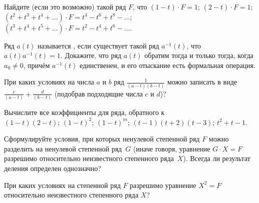 \documentclass[a4paper,12pt]{article}
\begin{document}
Найдите (если это возможно) такой ряд $F$, что
$(1-t)\cdot F=1$;
$(2-t)\cdot F=1$;
$(t^2+t^3+t^4+\dots)\cdot F=t^4-t^6+t^8-\dots$;
$(t^3+t^4+t^5+\dots)\cdot F=t^2-t^4+t^6-\dots$.








Ряд $a(t)$ называется , если существует такой ряд
$a^{-1}(t)$, что $a(t)a^{-1}(t)=1$. Докажите, что ряд
$a(t)$ обратим тогда и только тогда, когда $a_0\ne 0$,
причём $a^{-1}(t)$ единственен, и его отыскание есть
формальная операция.








При каких условиях на числа $a$ и $b$ ряд
$\displaystyle\frac1{(a-t)(b-t)}$ можно записать в виде
$\displaystyle\frac{c}{(a-t)}+\frac{d}{(b-t)}$
(подобрав подходящие числа $c$ и $d$)?








Вычислите все коэффициенты для ряда, обратного к
\\
 $(1-t)(2-t)$;
 $(1-t)^{2}$;
 $(1-t)^{m}$;
 $(t-1)(t+2)(t-3)$;
 $t^{2}+t-1$.






Сформулируйте условия, при которых ненулевой степенной ряд $F$ можно
разделить на ненулевой степенной ряд~$G$ (иначе говоря, уравнение $G\cdot
X=F$ разрешимо относительно неизвестного степенного ряда~$X$).
Всегда ли результат деления определен однозначно?




При каких условиях на степенной ряд $F$ разрешимо уравнение $X^2 = F$ относительно неизвестного степенного ряда $X$?




\newpage
{}
\end{document}
